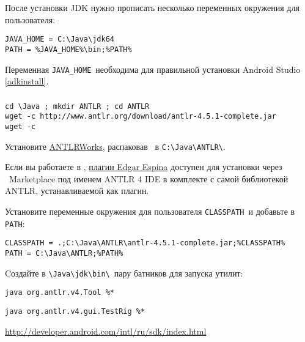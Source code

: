 \bigskip
После установки JDK нужно прописать несколько переменных окружения для 
пользователя:

\begin{verbatim}
JAVA_HOME = C:\Java\jdk64
PATH = %JAVA_HOME%\bin;%PATH%
\end{verbatim}

Переменная \verb|JAVA_HOME|\ необходима для правильной установки
Android Studio \ref{adkinstall}.


\subsubsection{\win}

\begin{verbatim}
cd \Java ; mkdir ANTLR ; cd ANTLR
wget -c http://www.antlr.org/download/antlr-4.5.1-complete.jar
wget -c 
\end{verbatim}

Установите \href{http://tunnelvisionlabs.com/products/demo/antlrworks}{ANTLRWorks},
распаковав \ в \verb|C:\Java\ANTLR\|.
\bigskip

Если вы работаете в \eclipse, 
\href{https://github.com/jknack/antlr4ide}{плагин Edgar Espina}
доступен для установки через \eclipse\ Marketplace под именем
ANTLR 4 IDE в комплекте с самой библиотекой ANTLR, устанавливаемой как плагин.
\bigskip

Установите переменные окружения для пользователя \verb|CLASSPATH|\ и добавьте в \verb|PATH|:

\begin{verbatim}
CLASSPATH = .;C:\Java\ANTLR\antlr-4.5.1-complete.jar;%CLASSPATH%
PATH = C:\Java\ANTLR;%PATH%
\end{verbatim}

Cоздайте в \verb|\Java\jdk\bin\|\ пару батников для запуска утилит:

\begin{lstlisting}[title=\file{antlr4.bat}]
java org.antlr.v4.Tool %*
\end{lstlisting}
\begin{lstlisting}[title=\file{grun.bat}]
java org.antlr.v4.gui.TestRig %*
\end{lstlisting}

\label{adkinstall}

\url{http://developer.android.com/intl/ru/sdk/index.html}\bigskip

